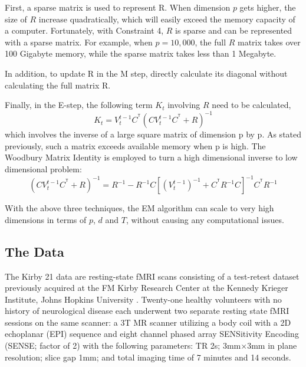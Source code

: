 \documentclass[fleqn]{article}
\newcommand{\T}{^{\ensuremath{\mathsf{T}}}}           %
\begin{document}
First, a sparse matrix is used to represent R. When dimension $p$ gets higher, the size of $R$ increase quadratically, which will easily exceed the memory capacity of a computer.  Fortunately, with Constraint 4, $R$ is sparse and can be represented with a sparse matrix. For example, when $p=10,000$, the full $R$ matrix takes over 100 Gigabyte memory, while the sparse matrix takes less than 1 Megabyte.

In addition, to update R in the M step, directly calculate its diagonal without calculating the full matrix R.

Finally, in the E-step, the following term $K_t$ involving $R$ need to be calculated,
\[
K_t=V_t^{t-1}C^{\T}(CV_t^{t-1}C^{\T}+R)^{-1}
\]
which involves the inverse of a large square matrix of dimension p by p. As stated previously, such a matrix exceeds available memory when p is high. The Woodbury Matrix Identity is employed to turn a high dimensional inverse to low dimensional problem:
\[
(CV_t^{t-1}C^{\T}+R)^{-1} = R^{-1} - R^{-1}C[(V_t^{t-1})^{-1} + C^{\T}R^{-1}C]^{-1}C^{\T}R^{-1}
\]

With the above three techniques, the EM algorithm can scale to very high dimensions in terms of $p$, $d$ and $T$, without causing any computational issues.

\subsection{The Data}

The Kirby 21 data are resting-state fMRI scans consisting of a test-retest dataset previously acquired at the FM Kirby Research Center at the Kennedy Krieger Institute, Johns Hopkins University \cite{landman2011multi}. Twenty-one healthy volunteers with no history of neurological disease each underwent two separate resting state fMRI sessions on the same scanner: a 3T MR scanner utilizing a body coil with a 2D echoplanar (EPI) sequence and eight channel phased array SENSitivity Encoding (SENSE; factor of 2) with the following parameters: TR 2s; 3mm$\times$3mm in plane resolution; slice gap 1mm; and total imaging time of 7 minutes and 14 seconds.
\end{document}
